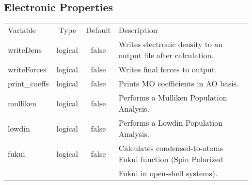 \documentclass[journal=jctcce,manuscript=article]{achemso}
\begin{document}
    \subsection{Electronic Properties}
    \begin{table}  [H]
      \begin{center}
      \begin{tabular}{ l c c l}
         Variable      & Type    & Default & Description \\
         writeDens     & logical & false   & Writes electronic density to an output file after calculation. \\
         writeForces   & logical & false   & Writes final forces to output. \\
         print\_coeffs & logical & false   & Prints MO coefficients in AO basis. \\
         mulliken      & logical & false   & Performs a Mulliken Population Analysis. \\
         lowdin        & logical & false   & Performs a Lowdin Population Analysis. \\
         fukui         & logical & false   & Calculates condensed-to-atoms Fukui function (Spin Polarized \\
         & &                               & Fukui in open-shell systems).
       \end{tabular}
       \end{center}
      \label{lio.properties.var}
    \end{table}
\end{document}
